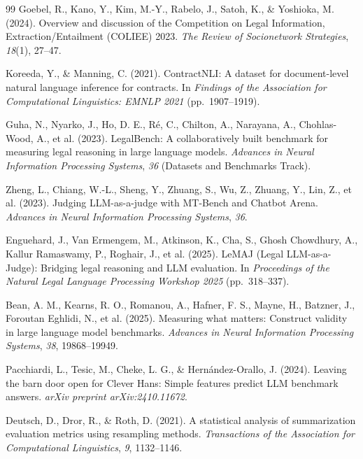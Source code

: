 \begin{thebibliography}{99}
Goebel, R., Kano, Y., Kim, M.-Y., Rabelo, J., Satoh, K., \& Yoshioka, M. (2024).
Overview and discussion of the Competition on Legal Information,
Extraction/Entailment (COLIEE) 2023. \textit{The Review of Socionetwork
Strategies}, \textit{18}(1), 27--47.

Koreeda, Y., \& Manning, C. (2021). ContractNLI: A dataset for document-level
natural language inference for contracts. In \textit{Findings of the
Association for Computational Linguistics: EMNLP 2021} (pp.~1907--1919).

Guha, N., Nyarko, J., Ho, D. E., R\'e, C., Chilton, A., Narayana, A.,
Chohlas-Wood, A., et al. (2023). LegalBench: A collaboratively built benchmark
for measuring legal reasoning in large language models. \textit{Advances in
Neural Information Processing Systems}, \textit{36} (Datasets and Benchmarks
Track).

Zheng, L., Chiang, W.-L., Sheng, Y., Zhuang, S., Wu, Z., Zhuang, Y., Lin, Z.,
et al. (2023). Judging LLM-as-a-judge with MT-Bench and Chatbot Arena.
\textit{Advances in Neural Information Processing Systems}, \textit{36}.

Enguehard, J., Van Ermengem, M., Atkinson, K., Cha, S., Ghosh Chowdhury, A.,
Kallur Ramaswamy, P., Roghair, J., et al. (2025). LeMAJ (Legal LLM-as-a-Judge):
Bridging legal reasoning and LLM evaluation. In \textit{Proceedings of the
Natural Legal Language Processing Workshop 2025} (pp.~318--337).

Bean, A. M., Kearns, R. O., Romanou, A., Hafner, F. S., Mayne, H., Batzner, J.,
Foroutan Eghlidi, N., et al. (2025). Measuring what matters: Construct validity
in large language model benchmarks. \textit{Advances in Neural Information
Processing Systems}, \textit{38}, 19868--19949.

Pacchiardi, L., Tesic, M., Cheke, L. G., \& Hern\'andez-Orallo, J. (2024).
Leaving the barn door open for Clever Hans: Simple features predict LLM
benchmark answers. \textit{arXiv preprint arXiv:2410.11672}.

Deutsch, D., Dror, R., \& Roth, D. (2021). A statistical analysis of
summarization evaluation metrics using resampling methods.
\textit{Transactions of the Association for Computational Linguistics},
\textit{9}, 1132--1146.


\end{thebibliography}

